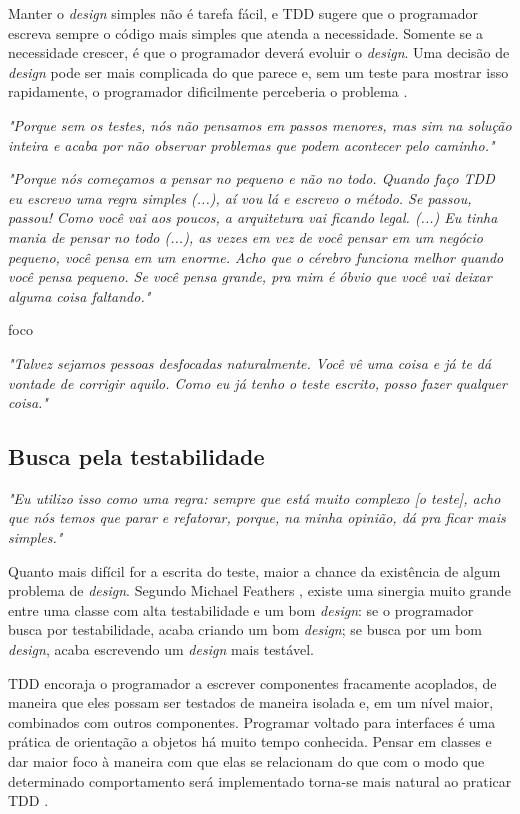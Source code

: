 Manter o \textit{design} simples não é tarefa fácil, e TDD sugere que o programador
escreva sempre o código mais simples que atenda a necessidade. Somente se a
necessidade crescer, é que o programador deverá evoluir o \textit{design}. Uma decisão de
\textit{design} pode ser mais complicada do que parece e, sem um teste para mostrar isso
rapidamente, o programador dificilmente perceberia o problema \cite{aim-fire}.

\textit{"Porque sem os testes, nós não pensamos em passos menores, mas sim na solução inteira
e acaba por não observar problemas que podem acontecer pelo caminho."}

\textit{"Porque nós começamos a pensar no pequeno e não no todo. Quando faço TDD eu escrevo
uma regra simples (...), aí vou lá e escrevo o método. Se passou, passou! Como você vai aos poucos,
a arquitetura vai ficando legal. (...) Eu tinha mania de pensar no todo (...), as vezes
em vez de você pensar em um negócio pequeno, você pensa em um enorme. Acho que o cérebro funciona
melhor quando você pensa pequeno. Se você pensa grande, pra mim é óbvio que você vai deixar
alguma coisa faltando."}

foco

\textit{"Talvez sejamos pessoas desfocadas naturalmente. Você vê uma coisa e já te dá vontade
de corrigir aquilo. Como eu já tenho o teste escrito, posso fazer qualquer coisa."}


\subsection{Busca pela testabilidade}

\textit{"Eu utilizo isso como uma regra: sempre que está muito complexo [o teste],
acho que nós temos que parar e refatorar, porque, na minha opinião, dá
pra ficar mais simples."}

Quanto mais difícil for a escrita do teste, maior a chance da existência de
algum problema de \textit{design}. Segundo Michael Feathers \cite{feathers-synergy}, 
existe uma sinergia muito
grande entre uma classe com alta testabilidade e um bom \textit{design}: se o
programador busca por testabilidade, acaba criando um bom \textit{design}; se 
busca por um bom \textit{design}, acaba escrevendo um \textit{design} mais
testável.

TDD encoraja o programador a escrever componentes fracamente acoplados, de
maneira que eles possam ser testados de maneira isolada e, em um nível maior,
combinados com outros componentes.
Programar voltado para interfaces é uma prática de orientação a objetos há muito
tempo conhecida. Pensar em classes e dar maior foco à maneira com que
elas se relacionam do que com o modo que determinado comportamento será implementado
torna-se mais natural ao praticar TDD \cite{GOOS}. 

